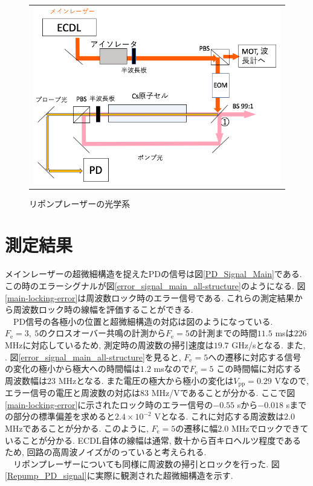 \documentclass[uplatex, dvipdfmx, a4paper, report, papersize, 11pt]{jsbook}
\begin{document}
\begin{figure}[htpb]
\begin{tabular}{c}
      \begin{minipage}{1\hsize}
        \centering
          \includegraphics[keepaspectratio,  scale=0.35,  angle=0]
                          {figures/saturated-absorption/repump_diagram.png}
                          \caption{リポンプレーザーの光学系}
                          \label{repump_diagram}
      \end{minipage}
    \end{tabular}
\end{figure}

\section{測定結果}

メインレーザーの超微細構造を捉えたPDの信号は図\ref{PD_Signal_Main}である. この時のエラーシグナルが図\ref{error_signal_main_all-structure}のようになる. 図\ref{main-locking-error}は周波数ロック時のエラー信号である. これらの測定結果から周波数ロック時の線幅を評価することができる. \\
　PD信号の各極小の位置と超微細構造の対応は図のようになっている. $F_{\mathrm{e}} = 3,\ 5$のクロスオーバー共鳴の計測から$F_{\mathrm{e}} = 5$の計測までの時間$11.5$ msは$226$ MHzに対応しているため, 測定時の周波数の掃引速度は$19.7$ GHz/sとなる. また, . 図\ref{error_signal_main_all-structure}を見ると, $F_{\mathrm{e}} = 5$への遷移に対応する信号の変化の極小から極大への時間幅は$1.2$ msなので$F_{\mathrm{e}} = 5$
この時間幅に対応する周波数幅は$23$ MHzとなる. また電圧の極大から極小の変化は$V_{\mathrm{pp}} = 0.29$ Vなので, エラー信号の電圧と周波数の対応は$83$ MHz/Vであることが分かる. ここで図\ref{main-locking-error}に示されたロック時のエラー信号の$-0.55$ sから$-0.018$ sまでの部分の標準偏差を求めると$2.4\times 10^{-2}$ Vとなる. これに対応する周波数は$2.0$ MHzであることが分かる. このように, $F_{\mathrm{e}} = 5$の遷移に幅$2.0$ MHzでロックできていることが分かる. ECDL自体の線幅は通常, 数十から百キロヘルツ程度であるため, 回路の高周波ノイズがのっていると考えられる. \\
　リポンプレーザーについても同様に周波数の掃引とロックを行った. 図\ref{Repump_PD_signal}に実際に観測された超微細構造を示す.
\end{document}
